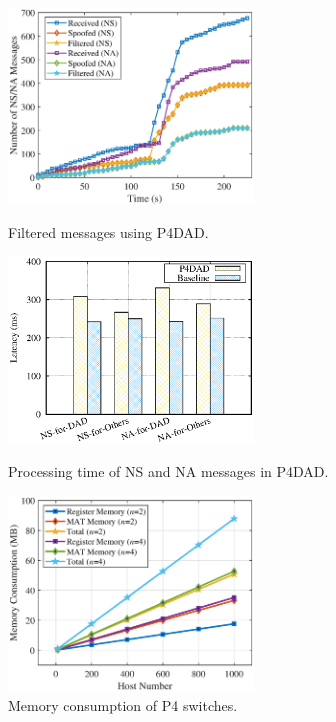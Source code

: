 \documentclass[journal]{IEEEtran}
\begin{document}

            \begin{figure}[htbp]
            \centering
                \begin{minipage}[t]{0.32\textwidth}
                    \centering
                    \includegraphics[width=6.5cm]{figure/Filtered.eps}
                    \caption{Filtered messages using P4DAD.}
                    \label{fig:P4DAD-filtered}
                \end{minipage}
                \begin{minipage}[t]{0.32\textwidth}
                    \centering
                    \includegraphics[width=6.5cm]{figure/BaselineP4dad.eps}
                    \caption{Processing time of NS and NA messages in P4DAD.}
                    \label{fig:P4DAD-baseline}
                \end{minipage}
                \begin{minipage}[t]{0.32\textwidth}
                    \centering
                    \includegraphics[width=6.5cm]{figure/MemoryConsumption.eps}
                    \caption{Memory consumption of P4 switches.}
                    \label{fig:Memory-Consumption}
                \end{minipage}
            \end{figure}
\end{document}
